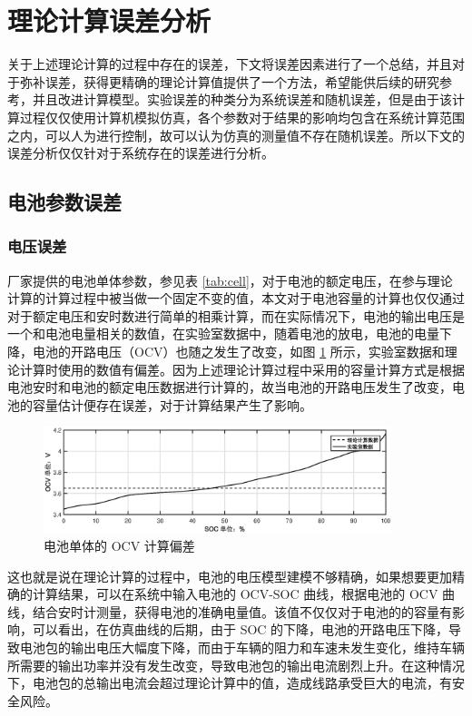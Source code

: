 \section{理论计算误差分析}
关于上述理论计算的过程中存在的误差，下文将误差因素进行了一个总结，并且对于弥补误差，获得更精确的理论计算值提供了一个方法，希望能供后续的研究参考，并且改进计算模型。实验误差的种类分为系统误差和随机误差，但是由于该计算过程仅仅使用计算机模拟仿真，各个参数对于结果的影响均包含在系统计算范围之内，可以人为进行控制，故可以认为仿真的测量值不存在随机误差。所以下文的误差分析仅仅针对于系统存在的误差进行分析。

\subsection{电池参数误差}

\subsubsection{电压误差}
厂家提供的电池单体参数，参见表 \ref{tab:cell}，对于电池的额定电压，在参与理论计算的计算过程中被当做一个固定不变的值，本文对于电池容量的计算也仅仅通过对于额定电压和安时数进行简单的相乘计算，而在实际情况下，电池的输出电压是一个和电池电量相关的数值，在实验室数据中，随着电池的放电，电池的电量下降，电池的开路电压（OCV）也随之发生了改变，如图 \ref{fig:cell_deviat} 所示，实验室数据和理论计算时使用的数值有偏差。因为上述理论计算过程中采用的容量计算方式是根据电池安时和电池的额定电压数据进行计算的，故当电池的开路电压发生了改变，电池的容量估计便存在误差，对于计算结果产生了影响。

\begin{figure}
	\centering
	\includegraphics[width=0.9\textwidth]{figures/cell_deviat.eps}
	\caption{电池单体的 OCV 计算偏差}\label{fig:cell_deviat}
\end{figure}

这也就是说在理论计算的过程中，电池的电压模型建模不够精确，如果想要更加精确的计算结果，可以在系统中输入电池的 OCV-SOC 曲线，根据电池的 OCV 曲线，结合安时计测量，获得电池的准确电量值。该值不仅仅对于电池的的容量有影响，可以看出，在仿真曲线的后期，由于 SOC 的下降，电池的开路电压下降，导致电池包的输出电压大幅度下降，而由于车辆的阻力和车速未发生变化，维持车辆所需要的输出功率并没有发生改变，导致电池包的输出电流剧烈上升。在这种情况下，电池包的总输出电流会超过理论计算中的值，造成线路承受巨大的电流，有安全风险。

